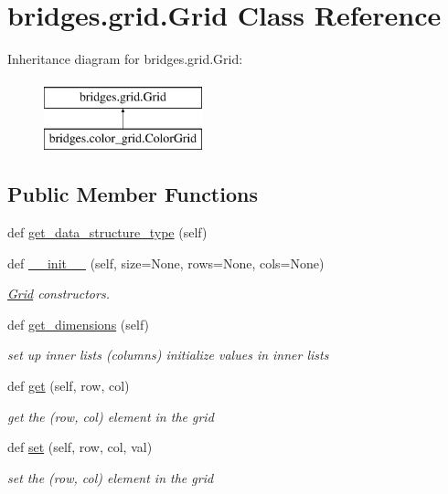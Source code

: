 \hypertarget{classbridges_1_1grid_1_1_grid}{}\section{bridges.\+grid.\+Grid Class Reference}
\label{classbridges_1_1grid_1_1_grid}
Inheritance diagram for bridges.\+grid.\+Grid\+:\begin{figure}[H]
\begin{center}
\leavevmode
\includegraphics[height=2.000000cm]{classbridges_1_1grid_1_1_grid}
\end{center}
\end{figure}
\subsection*{Public Member Functions}
\begin{DoxyCompactItemize}
\item 
def \mbox{\hyperlink{classbridges_1_1grid_1_1_grid_ab1a040a486bbad5259fec54fb885eac1}{get\+\_\+data\+\_\+structure\+\_\+type}} (self)
\item 
def \mbox{\hyperlink{classbridges_1_1grid_1_1_grid_a0c3b42851965c6b4f2e0c69f6b38ab96}{\+\_\+\+\_\+init\+\_\+\+\_\+}} (self, size=None, rows=None, cols=None)
\begin{DoxyCompactList}\small\item\em \mbox{\hyperlink{classbridges_1_1grid_1_1_grid}{Grid}} constructors. \end{DoxyCompactList}\item 
def \mbox{\hyperlink{classbridges_1_1grid_1_1_grid_a92ebe8a2155c2b1ba00a234c6965915d}{get\+\_\+dimensions}} (self)
\begin{DoxyCompactList}\small\item\em set up inner lists (columns) initialize values in inner lists \end{DoxyCompactList}\item 
def \mbox{\hyperlink{classbridges_1_1grid_1_1_grid_ac8e96eb04717ecd9ac23932af89e2d17}{get}} (self, row, col)
\begin{DoxyCompactList}\small\item\em get the (row, col) element in the grid \end{DoxyCompactList}\item 
def \mbox{\hyperlink{classbridges_1_1grid_1_1_grid_ae7ad05537d72c2fd13f41dc38ed8b90e}{set}} (self, row, col, val)
\begin{DoxyCompactList}\small\item\em set the (row, col) element in the grid \end{DoxyCompactList}\end{DoxyCompactItemize}
